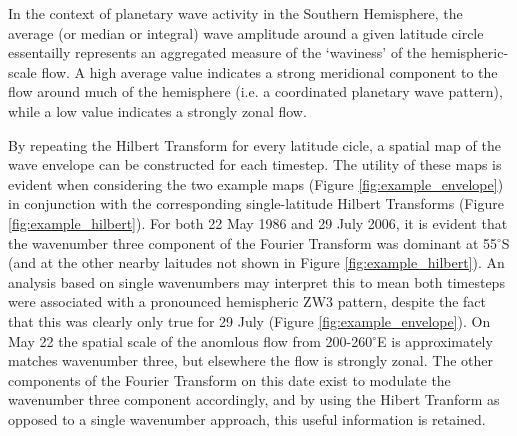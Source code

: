 In the context of planetary wave activity in the Southern Hemisphere, the average (or median or integral) wave amplitude around a given latitude circle essentailly represents an aggregated measure of the `waviness' of the hemispheric-scale flow. A high average value indicates a strong meridional component to the flow around much of the hemisphere (i.e. a coordinated planetary wave pattern), while a low value indicates a strongly zonal flow. 

By repeating the Hilbert Transform for every latitude cicle, a spatial map of the wave envelope can be constructed for each timestep. The utility of these maps is evident when considering the two example maps (Figure \ref{fig:example_envelope}) in conjunction with the corresponding single-latitude Hilbert Transforms (Figure \ref{fig:example_hilbert}). For both 22 May 1986 and 29 July 2006, it is evident that the wavenumber three component of the Fourier Transform was dominant at 55$^{\circ}$S (and at the other nearby laitudes not shown in Figure \ref{fig:example_hilbert}). An analysis based on single wavenumbers may interpret this to mean both timesteps were associated with a pronounced hemispheric ZW3 pattern, despite the fact that this was clearly only true for 29 July (Figure \ref{fig:example_envelope}). On May 22 the spatial scale of the anomlous flow from 200-260$^{\circ}$E is approximately matches wavenumber three, but elsewhere the flow is strongly zonal. The other components of the Fourier Transform on this date exist to modulate the wavenumber three component accordingly, and by using the Hibert Tranform as opposed to a single wavenumber approach, this useful information is retained.

